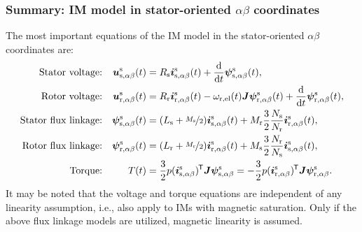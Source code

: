 \begin{frame}
	\frametitle{Summary: IM model in stator-oriented $\alpha\beta$ coordinates}
    The most important equations of the IM model in the stator-oriented $\alpha\beta$ coordinates are:
    \begin{equation*}
        \begin{alignedat}{4}
            &&\mbox{Stator voltage:}&& \quad\bm{u}^\mathrm{s}_\mathrm{s,\alpha\beta}(&t) &&= R_\mathrm{s} \bm{i}^\mathrm{s}_\mathrm{s,\alpha\beta}(t)+ \frac{\mathrm{d}}{\mathrm{d}t}\bm{\psi}^\mathrm{s}_\mathrm{s,\alpha\beta}(t),\\
            &&\mbox{Rotor voltage:}&& \quad\bm{u}^\mathrm{s}_\mathrm{r,\alpha\beta}(&t) &&= R_\mathrm{r} \bm{i}^\mathrm{s}_\mathrm{r,\alpha\beta}(t)-\omega_\mathrm{r,el}(t)\bm{J}\bm{\psi}^\mathrm{s}_\mathrm{r,\alpha\beta}(t) +\frac{\mathrm{d}}{\mathrm{d}t}\bm{\psi}^\mathrm{s}_\mathrm{r,\alpha\beta}(t),\\
            &&\mbox{Stator flux linkage:}&& \quad \bm{\psi}^\mathrm{s}_\mathrm{s,\alpha\beta}(&t) &&= (L_\mathrm{s} +\nicefrac{M_\mathrm{s}}{2}) \bm{i}^\mathrm{s}_{\mathrm{s},\alpha\beta}(t) +  M_{\mathrm{r}}\frac{3}{2}\frac{N_\mathrm{s}}{N_\mathrm{r}} \bm{i}^\mathrm{s}_{\mathrm{r},\alpha\beta}(t),\\
            &&\mbox{Rotor flux linkage:}&& \quad \bm{\psi}^\mathrm{s}_\mathrm{r,\alpha\beta}(&t) &&= (L_\mathrm{r} +\nicefrac{M_\mathrm{r}}{2}) \bm{i}^\mathrm{s}_{\mathrm{r},\alpha\beta}(t) +  M_{\mathrm{s}}\frac{3}{2}\frac{N_\mathrm{r}}{N_\mathrm{s}} \bm{i}^\mathrm{s}_{\mathrm{s},\alpha\beta}(t),\\
            &&\mbox{Torque:}&& \quad T(&t) &&= \frac{3}{2} p (\bm{i}_\mathrm{s,\alpha\beta}^\mathrm{s})^{\mkern-1.5mu\mathsf{T}}\bm{J}\bm{\psi}_\mathrm{s,\alpha\beta}^\mathrm{s}=-\frac{3}{2} p (\bm{i}^\mathrm{s}_\mathrm{r,\alpha\beta})^{\mkern-1.5mu\mathsf{T}}\bm{J}\bm{\psi}^\mathrm{s}_\mathrm{r,\alpha\beta}. 
        \end{alignedat}
    \end{equation*}
    It may be noted that the voltage and torque equations are independent of any linearity assumption, i.e., also apply to IMs with magnetic saturation. Only if the above flux linkage models are utilized, magnetic linearity is assumed.
\end{frame}

